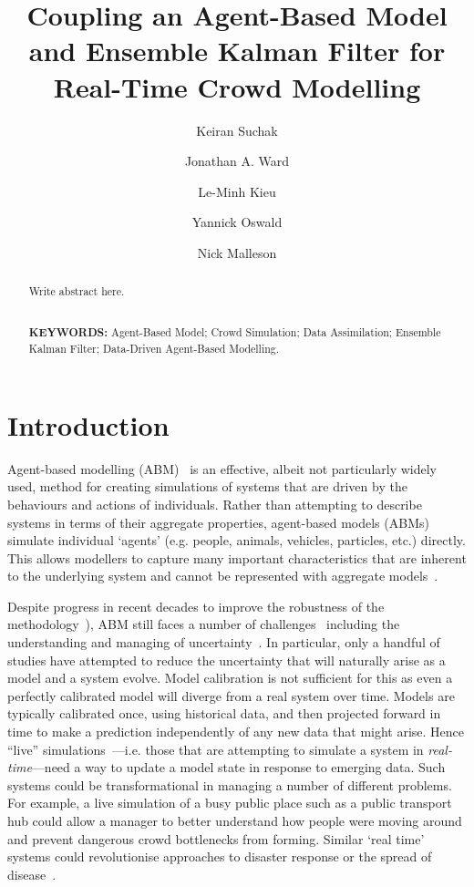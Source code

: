 \documentclass{article}
\title{Coupling an Agent-Based Model and Ensemble Kalman Filter for Real-Time Crowd Modelling}
\author{Keiran Suchak \and  Jonathan A. Ward \and Le-Minh Kieu \and  Yannick Oswald \and Nick Malleson}
\begin{document}
\maketitle{}

\begin{abstract}
    Write abstract here.
    
    $ $ \\ {\bf KEYWORDS:} Agent-Based Model; Crowd Simulation; Data Assimilation; Ensemble Kalman Filter; Data-Driven Agent-Based Modelling.
    
\end{abstract}



\section{Introduction}\label{sec:intro}

Agent-based modelling (ABM)~\citep{epstein_growing_1996, bonabeau_agent_2002} is an effective, albeit not particularly widely used, method for creating simulations of systems that are driven by the behaviours and actions of individuals. Rather than attempting to describe systems in terms of their aggregate properties, agent-based models (ABMs) simulate individual `agents' (e.g. people, animals, vehicles, particles, etc.) directly. This allows modellers to capture many important characteristics that are inherent to the underlying system and cannot be represented with aggregate models~\citep{an_challenges_2021, heppenstall_agentbased_2012}.

Despite progress in recent decades to improve the robustness of the methodology~\citep[e.g.][]{thiele_facilitating_2014}), ABM still faces a number of challenges~\citep[for example see][]{an_challenges_2021, filatova_spatial_2013, lippe_using_2019} including the understanding and managing of uncertainty~\citep{kieu_dealing_2020}. In particular, only a handful of studies have attempted to reduce the uncertainty that will naturally arise as a model and a system evolve. Model calibration is not sufficient for this as even a perfectly calibrated model will diverge from a real system over time.   Models are typically calibrated once, using historical data, and then projected forward in time to make a prediction independently of any new data that might arise. Hence ``live'' simulations~\cite{swarup_live_2020}---i.e. those that are attempting to simulate a system in \textit{real-time}---need a way to update a model state in response to emerging data. Such systems could be transformational in managing a number of different problems. For example, a live simulation of a busy public place such as a public transport hub could allow a manager to better understand how people were moving around and prevent dangerous crowd bottlenecks from forming. Similar `real time' systems could revolutionise approaches to disaster response or the spread of disease~\citep{swarup_live_2020}.
\end{document}
